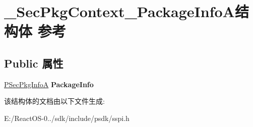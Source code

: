 \hypertarget{struct___sec_pkg_context___package_info_a}{}\section{\+\_\+\+Sec\+Pkg\+Context\+\_\+\+Package\+Info\+A结构体 参考}
\label{struct___sec_pkg_context___package_info_a}
\subsection*{Public 属性}
\begin{DoxyCompactItemize}
\item 
\mbox{\label{struct___sec_pkg_context___package_info_a_ad2f2d6bbc79687ef0151400dab434f84}} 
\hyperlink{struct___sec_pkg_info_a}{P\+Sec\+Pkg\+InfoA} {\bfseries Package\+Info}
\end{DoxyCompactItemize}


该结构体的文档由以下文件生成\+:\begin{DoxyCompactItemize}
\item 
E\+:/\+React\+O\+S-\/0../sdk/include/psdk/sspi.\+h\end{DoxyCompactItemize}
